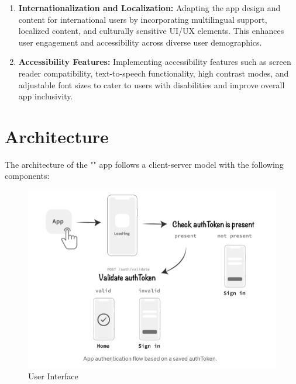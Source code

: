 \begin{enumerate}[label=\arabic*.]
    \item \textbf{Internationalization and Localization:} Adapting the app design and content for international users by incorporating multilingual support, localized content, and culturally sensitive UI/UX elements. This enhances user engagement and accessibility across diverse user demographics.
    
    \item \textbf{Accessibility Features:} Implementing accessibility features such as screen reader compatibility, text-to-speech functionality, high contrast modes, and adjustable font sizes to cater to users with disabilities and improve overall app inclusivity.
\end{enumerate}


\section{Architecture}

The architecture of the "{\myprojectname}" app follows a client-server model with the following components:

\begin{figure}
    \centering
    \includegraphics[width=0.9\linewidth]{Media//userLoginFlow.png}
    \caption{User Interface}
    \label{fig:User Interface}
\end{figure}

